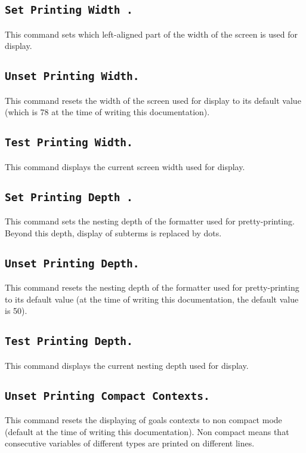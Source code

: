 \subsection[\tt Set Printing Width {\integer}.]{\tt Set Printing Width {\integer}.}
\label{SetPrintingWidth}
This command sets which left-aligned part of the width of the screen
is used for display.

\subsection[\tt Unset Printing Width.]{\tt Unset Printing Width.}
This command resets the width of the screen used for display to its
default value (which is 78 at the time of writing this documentation).

\subsection[\tt Test Printing Width.]{\tt Test Printing Width.}
This command displays the current screen width used for display.

\subsection[\tt Set Printing Depth {\integer}.]{\tt Set Printing Depth {\integer}.}
This command sets the nesting depth of the formatter used for
pretty-printing. Beyond this depth, display of subterms is replaced by
dots.

\subsection[\tt Unset Printing Depth.]{\tt Unset Printing Depth.}
This command resets the nesting depth of the formatter used for
pretty-printing to its default value (at the
time of writing this documentation, the default value is 50).

\subsection[\tt Test Printing Depth.]{\tt Test Printing Depth.}
This command displays the current nesting depth used for display.

\subsection[\tt Unset Printing Compact Contexts.]{\tt Unset Printing Compact Contexts.}
This command resets the displaying of goals contexts to non compact
mode (default at the time of writing this documentation). Non compact
means that consecutive variables of different types are printed on
different lines.

